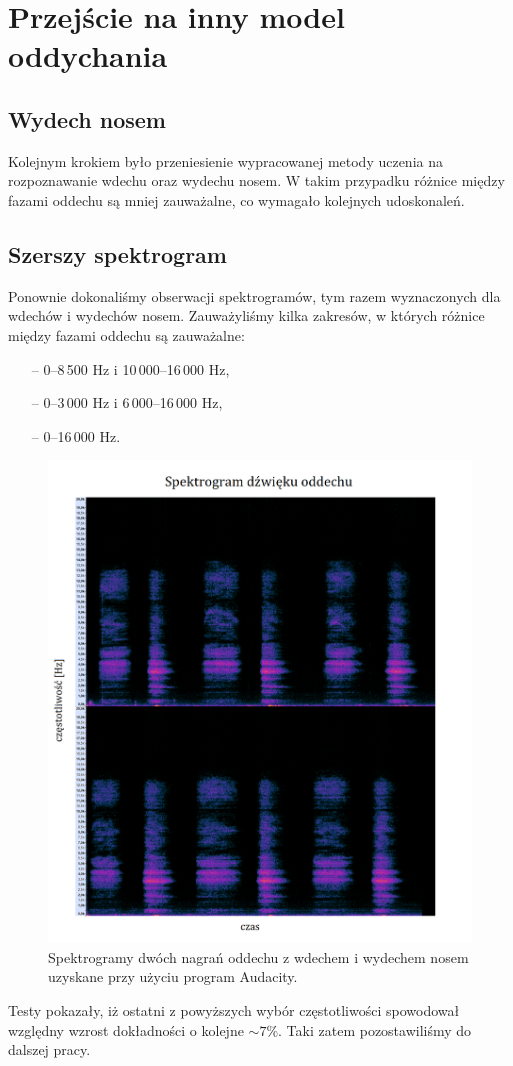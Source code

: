 \documentclass[polish]{article}
\begin{document}
\section{Przejście na inny model oddychania}
\subsection{Wydech nosem}
Kolejnym krokiem było przeniesienie wypracowanej metody uczenia na rozpoznawanie wdechu oraz wydechu nosem. W takim przypadku różnice między fazami oddechu są mniej zauważalne, co wymagało kolejnych udoskonaleń.
\subsection{Szerszy spektrogram}
Ponownie dokonaliśmy obserwacji spektrogramów, tym razem wyznaczonych dla wdechów i wydechów nosem. Zauważyliśmy kilka zakresów, w których różnice między fazami oddechu są zauważalne:
\begin{itemize}
	\setlength\itemsep{-0.25em}
	\item[--] 0--8\,500 \unit{Hz} i 10\,000--16\,000 \unit{Hz},
	\item[--] 0--3\,000 \unit{Hz} i 6\,000--16\,000 \unit{Hz},
	\item[--] 0--16\,000 \unit{Hz}.
\end{itemize}
\begin{figure}[H]
	\centering
	\includegraphics[width=13cm]{spektrogram_wydech_nosem}
	\caption{Spektrogramy dwóch nagrań oddechu z wdechem i wydechem nosem uzyskane przy użyciu program Audacity.}
\end{figure}
Testy pokazały, iż ostatni z powyższych wybór częstotliwości spowodował względny wzrost dokładności o kolejne $\sim7\%$. Taki zatem pozostawiliśmy do dalszej pracy.
\end{document}
